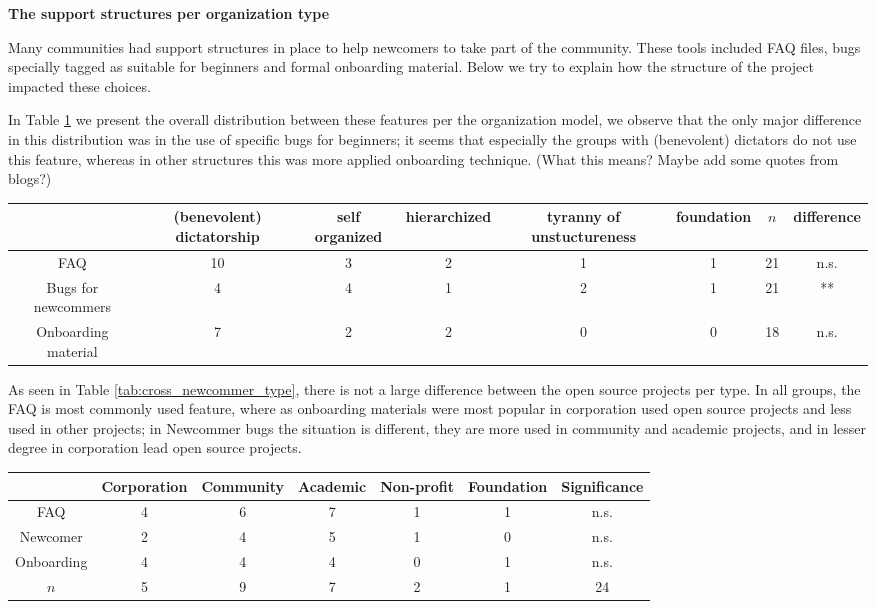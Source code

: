 \textbf{The support structures per organization type}

Many communities had support structures in place to help newcomers to take part of the community. These tools included FAQ files, bugs specially tagged as suitable for beginners and formal onboarding material. Below we try to explain how the structure of the project impacted these choices.

In Table \ref{tab:cross_newcommer_organization} we present the overall distribution between these features per the organization model, we observe that the only major difference in this distribution was in the use of specific bugs for beginners; it seems that especially the groups with (benevolent) dictators do not use this feature, whereas in other structures this was more applied onboarding technique. (What this means? Maybe add some quotes from blogs?)
 
\begin{table}
\begin{tabular}{|c|c|c|c|c|c|c|c|}
\hline
 & (benevolent) dictatorship & self organized & hierarchized & tyranny of unstuctureness & foundation & $n$ & difference \\
\hline
FAQ & 10 & 3 & 2 & 1 & 1 & 21 & n.s. \\
\hline
Bugs for newcommers & 4 & 4 & 1 & 2 & 1 & 21 & ** \\
\hline
Onboarding material & 7 & 2 & 2 & 0 & 0 & 18 & n.s. \\
\hline
\end{tabular}
\label{tab:cross_newcommer_organization}
\end{table}
 
As seen in Table \ref{tab:cross_newcommer_type}, there is not a large difference between the open source projects per type. In all groups, the FAQ is most commonly used feature, where as onboarding materials were most popular in corporation used open source projects and less used in other projects; in Newcommer bugs the situation is different, they are more used in community and academic projects, and in lesser degree in corporation lead open source projects.
 
\begin{table}
\begin{tabular}{|c|c|c|c|c|c|c|}
\hline
 & Corporation & Community & Academic & Non-profit & Foundation & Significance \\
\hline
FAQ & 4 & 6 & 7 & 1 & 1 & n.s. \\
\hline
Newcomer & 2 & 4 & 5 & 1 & 0 & n.s. \\
\hline
Onboarding & 4 & 4 & 4 & 0 & 1 & n.s. \\
\hline
$n$ & 5 & 9 & 7 & 2 & 1 & 24 \\
\hline
\end{tabular}
\end{table}